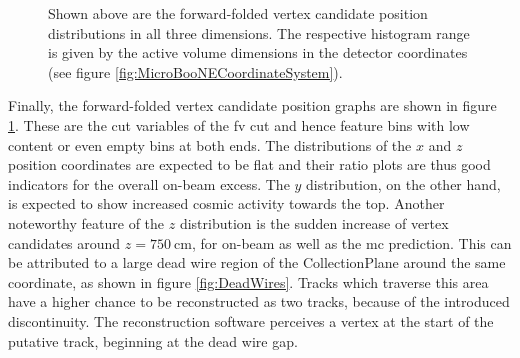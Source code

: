 
\begin{figure}[htbp]
    \centering
    \caption[Forward-Folded Vertex Candidate Position Distributions]{Shown above are the forward-folded vertex candidate position distributions in all three dimensions. The respective histogram range is given by the active volume dimensions in the detector coordinates (see figure \ref{fig:MicroBooNECoordinateSystem}).}
    \label{fig:ForwardFoldedVertexPosition}
\end{figure}
Finally, the forward-folded vertex candidate position graphs are shown in figure \ref{fig:ForwardFoldedVertexPosition}. These are the cut variables of the \gls{fv} cut and hence feature bins with low content or even empty bins at both ends. The distributions of the $x$ and $z$ position coordinates are expected to be flat and their ratio plots are thus good indicators for the overall on-beam excess. The $y$ distribution, on the other hand, is expected to show increased cosmic activity towards the top. Another noteworthy feature of the $z$ distribution is the sudden increase of vertex candidates around $z=\SI{750}{\centi\metre}$, for on-beam as well as the \gls{mc} prediction. This can be attributed to a large dead wire region of the \gls{CollectionPlane} around the same coordinate, as shown in figure \ref{fig:DeadWires}. Tracks which traverse this area have a higher chance to be reconstructed as two tracks, because of the introduced discontinuity. The reconstruction software perceives a vertex at the start of the putative track, beginning at the dead wire gap.

